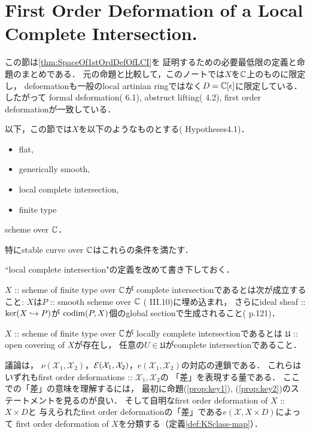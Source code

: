 \documentclass[a4paper]{jsarticle}
\newcommand{\famX}{\mathcal{X}}
\newcommand{\cvU}{\mathfrak{U}}
\begin{document}
\section{First Order Deformation of a Local Complete Intersection.}
    この節は\ref{thm:SpaceOf1stOrdDefOfLCI}を
    証明するための必要最低限の定義と命題のまとめである．
    元の命題と比較して，このノートでは$X$を$\mathbb{C}$上のものに限定し，
    defoemationも一般のlocal artinian ringではなく$D=\mathbb{C}[\epsilon]$に限定している．
    したがって
    formal deformation(\cite{DefLCI} 6.1),
    abstruct lifting(\cite{DefLCI} 4.2), 
    first order deformationが一致している．

    以下，この節では$X$を以下のようなものとする(\cite{DefLCI} Hypotheses4.1)．
    \begin{screen}
    \begin{itemize}
        \item flat,
        \item generically smooth,
        \item local complete intersection,
        \item finite type
    \end{itemize}
        scheme over $\mathbb{C}$．
    \end{screen}
    特にstable curve over $\mathbb{C}$はこれらの条件を満たす．

    ``local complete intersection"の定義を改めて書き下しておく．
    \begin{Def}
        $X$ :: scheme of finite type over $\mathbb{C}$が
        complete intersectionであるとは次が成立すること:
        $X$は$P$ :: smooth scheme over $\mathbb{C}$ (\cite{HarAG} III.10)に埋め込まれ，
        さらにideal sheaf :: $\ker(X \hookrightarrow P)$が
        $\operatorname{codim}(P, X)$個のglobal sectionで生成されること(\cite{HarAG} p.121)．

        $X$ :: scheme of finite type over $\mathbb{C}$が
        locally complete intersectionであるとは
        $\cvU$ :: open covering of $X$が存在し，
        任意の$U \in \cvU$がcomplete intersectionであること．
    \end{Def}
    
    議論は，
    $\nu(\famX_1, \famX_2)$，$\shE(\famX_1, \famX_2)$，$e(\famX_1, \famX_2)$の対応の連鎖である．
    これらはいずれもfirst order deformations :: $\famX_1, \famX_2$の
    「差」を表現する量である．
    ここでの「差」の意味を理解するには，
    最初に命題(\ref{prop:key1}), (\ref{prop:key2})のステートメントを見るのが良い．
    そして自明なfirst order deformation of $X$ :: $X \times D$と
    与えられたfirst order deformationの「差」である$e(\famX, X \times D)$によって
    first order deformation of $X$を分類する（定義\ref{def:KSclass-map}）．
\end{document}
